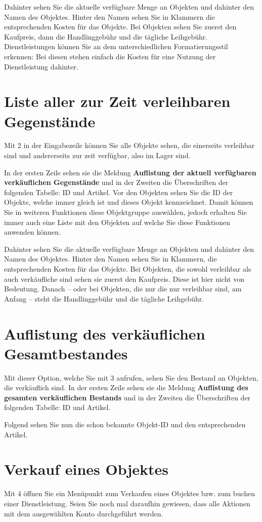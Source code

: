 ﻿\documentclass[a4paper,12pt,titlepage]{article}
\newcommand\enquote[1]{{\ttfamily \bfseries #1}}
\begin{document}
Dahinter sehen Sie die aktuelle verfügbare Menge an Objekten und dahinter den Namen des Objektes.
Hinter den Namen sehen Sie in Klammern die entsprechenden Kosten für das Objekte.
Bei Objekten sehen Sie zuerst den Kaufpreis, dann die Handlinggebühr und die tägliche Leihgebühr.
Dienstleistungen können Sie an dem unterschiedlichen Formatierungsstil erkennen:
Bei diesen stehen einfach die Kosten für eine Nutzung der Dienstleistung dahinter.

\section{Liste aller zur Zeit verleihbaren Gegenstände}
Mit 2 in der Eingabezeile können Sie alle Objekte sehen,
 die einerseits verleihbar sind und andererseits zur zeit verfügbar, also im Lager sind.

In der ersten Zeile sehen sie die Meldung \enquote{Auflistung der aktuell verfügbaren verkäuflichen Gegenstände}
 und in der Zweiten die Überschriften der folgenden Tabelle: ID und Artikel.
Vor den Objekten sehen Sie die ID der Objekte, welche immer gleich ist und dieses Objekt kennzeichnet.
Damit können Sie in weiteren Funktionen diese Objektgruppe auswählen,
 jedoch erhalten Sie immer auch eine Liste mit den Objekten auf welche Sie diese Funktionen anwenden können.

Dahinter sehen Sie die aktuelle verfügbare Menge an Objekten und dahinter den Namen des Objektes.
Hinter den Namen sehen Sie in Klammern, die entsprechenden Kosten für das Objekte.
Bei Objekten, die sowohl verleihbar als auch verkäufliche sind sehen sie zuerst den Kaufpreis.
Diese ist hier nicht von Bedeutung.
Danach -- oder bei Objekten, die nur die nur verleihbar sind, am Anfang --
steht die Handlinggebühr und die tägliche Leihgebühr.

\section{Auflistung des verkäuflichen Gesamtbestandes}
Mit dieser Option, welche Sie mit 3 aufrufen, sehen Sie den Bestand an Objekten, die verkäuflich sind.
In der ersten Zeile sehen sie die Meldung \enquote{Auflistung des gesamten verkäuflichen Bestands}
 und in der Zweiten die Überschriften der folgenden Tabelle: ID und Artikel.

Folgend sehen Sie nun die schon bekannte Objekt-ID und den entsprechenden Artikel.

\section{Verkauf eines Objektes}
Mit 4 öffnen Sie ein Menüpunkt zum Verkaufen eines Objektes bzw. zum buchen einer Dienstleistung.
Seien Sie noch mal daraufhin gewiesen, dass alle Aktionen mit dem ausgewählten Konto durchgeführt werden.
\end{document}
